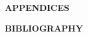 \documentclass[oneside,11pt,letter]{reportUofM} %
\begin{document}


\vspace*{3.5in}
\begin{center}
{\large\bfseries  APPENDICES}
\end{center}
\newpage

\cp


\vspace*{3.5in}
\begin{center}
{\large\bfseries  BIBLIOGRAPHY}
\end{center}
\newpage

\begin{smallspace}{1}{9pt}


\end{smallspace}
\end{document}

